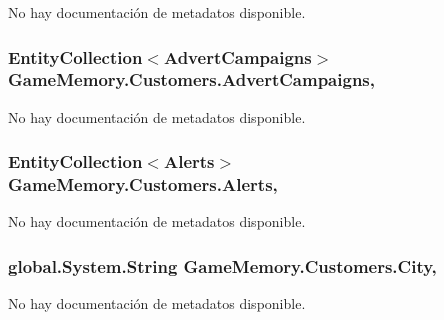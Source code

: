 No hay documentación de metadatos disponible. 

\hypertarget{class_game_memory_1_1_customers_ad2341da5ce9ef77380bb9f81aace8ff5}{
\subsubsection[{Advert\-Campaigns}]{\setlength{\rightskip}{0pt plus 5cm}Entity\-Collection$<${\bf Advert\-Campaigns}$>$ Game\-Memory.\-Customers.\-Advert\-Campaigns\hspace{0.3cm}{\ttfamily [get]}, {\ttfamily [set]}}}\label{class_game_memory_1_1_customers_ad2341da5ce9ef77380bb9f81aace8ff5}


No hay documentación de metadatos disponible. 

\hypertarget{class_game_memory_1_1_customers_a43d61d4c5dffe15a97d8b48da9a97a19}{
\subsubsection[{Alerts}]{\setlength{\rightskip}{0pt plus 5cm}Entity\-Collection$<${\bf Alerts}$>$ Game\-Memory.\-Customers.\-Alerts\hspace{0.3cm}{\ttfamily [get]}, {\ttfamily [set]}}}\label{class_game_memory_1_1_customers_a43d61d4c5dffe15a97d8b48da9a97a19}


No hay documentación de metadatos disponible. 

\hypertarget{class_game_memory_1_1_customers_adca84dbe266ae65ba70627ec94714276}{
\subsubsection[{City}]{\setlength{\rightskip}{0pt plus 5cm}global.\-System.\-String Game\-Memory.\-Customers.\-City\hspace{0.3cm}{\ttfamily [get]}, {\ttfamily [set]}}}\label{class_game_memory_1_1_customers_adca84dbe266ae65ba70627ec94714276}


No hay documentación de metadatos disponible. 

